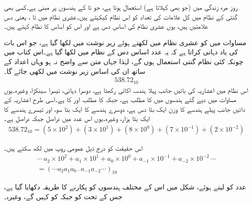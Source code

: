 

روز مرہ زندگی میں  (جو   بھی کہلاتا ہے)  استعمال ہوتا ہے، جو  تا  کے ہندسوں پر مبنی ہے۔کسی بھی گنتی کے نظام میں کل علامات کی تعداد کو اس نظام کیکہتے ہیں۔عشری  نظام میں  تا ، یعنی دس  علامتیں  ہیں، یوں عشری  نظام کی اساس دس ہے اور اس کو اساس  کا نظام کہتے ہیں۔

	مساوات  میں  کو عشری  نظام میں لکھتے ہوئے زیر نوشت میں  لکھا گیا ہے، جو اس بات کی یاد دہانی کراتا ہے کہ یہ عدد اساس دس کے نظام میں لکھا گیا ہے۔اس کتاب میں چونکہ کئی نظام گنتی استعمال ہوں گے، لہٰذا جہاں متن سے واضح نہ ہو وہاں اعداد کے ساتھ ان کی اساس زیر نوشت میں لکھی جائے گا۔
\begin{align}\label{مساوات_ثنائی_عدد}
538.72_{10}
\end{align}
اس نظام میں اعشاریہ کی بائیں جانب پہلا ہندسہ  اکائی  رکھتا ہے، دوسرا دہائی، تیسرا سینکڑا، وغیرہ۔یوں مساوات  میں دیے گئے ہندسوں میں  کا  مطلب  ہے، جبکہ  کا مطلب  اور  کا  ہے۔اسی طرح اعشاریہ کے دائیں جانب پہلے ہندسے کا وزن ایک بٹا دس ہے، دوسرے ہندسے کا ایک بٹا سو، اور تیسرے ہندسے کا ایک بٹا ہزار، وغیرہ۔یوں اس عدد میں  دراصل  جبکہ  دراصل  ہے۔
\begin{align}\label{مساوات_ثنائی_سینکڑا}
538.72_{10}=(5\times 10^2)+(3\times 10^1)+(8\times 10^0)+(7\times 10^{-1})+(2\times 10^{-2})
\end{align}

اس حقیقت کو درج ذیل عمومی روپ میں لکھ سکتے ہیں۔
\begin{multline}\label{مساوات_ثنائی_عمومی_روپ}
\cdots \,a_2\times 10^2+a_1\times 10^1+a_0\times 10^0+a_{-1}\times 10^{-1}+a_{-2}\times 10^{-2}\, \cdots\\
=(\cdots a_2a_1a_0\, .\, a_{-1}a_{-2}\cdots)_{10}
\end{multline}

 عدد  کو  لیتے ہوئے، شکل  میں اس کے مختلف ہندسوں کو پکارنے کا طریقہ دکھایا گیا ہے، جس کے تحت  کو  جبکہ  کو  کہیں گے، وغیرہ۔

